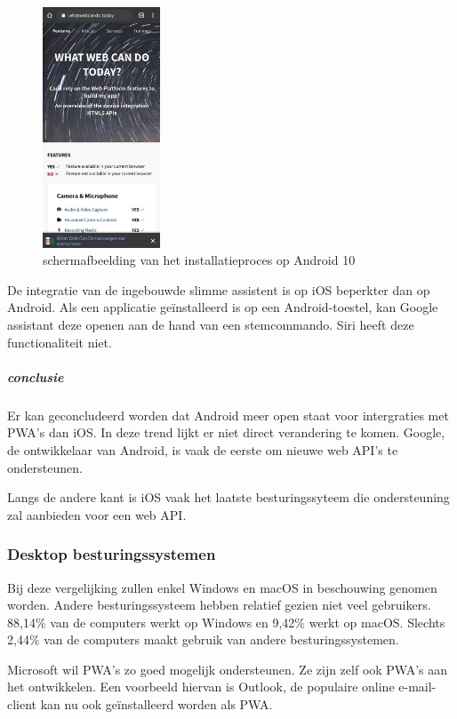 		\begin{figure}[H]
			\centering
			\includegraphics[width=35mm]{./img/installation_android.png}
			\caption{schermafbeelding van het installatieproces op Android 10}
			\label{A2HSExperienceIOS}
		\end{figure}
	
	
		De integratie van de ingebouwde slimme assistent is op iOS beperkter dan op Android. Als een applicatie geïnstalleerd is op een Android-toestel, kan Google assistant deze openen aan de hand van een stemcommando. Siri heeft deze functionaliteit niet.
		\autocite{Lathiya2020}
		
		\newpage
		\subparagraph{conclusie}
		
			Er kan geconcludeerd worden dat Android meer open staat voor intergraties met PWA's dan iOS. In deze trend lijkt er niet direct verandering te komen. Google, de ontwikkelaar van Android, is vaak de eerste om nieuwe web API's te ondersteunen.
			
			Langs de andere kant is iOS vaak het laatste besturingssyteem die ondersteuning zal aanbieden voor een web API.
	
	
	\subsubsection{Desktop besturingssystemen}
		Bij deze vergelijking zullen enkel Windows en macOS in beschouwing genomen worden. Andere besturingssysteem hebben relatief gezien niet veel gebruikers. 88,14\% van de computers werkt op Windows en 9,42\% werkt op macOS. Slechts 2,44\% van de computers maakt gebruik van andere besturingssystemen.
		\autocite{netMarketShare2020}
		
		Microsoft wil PWA's zo goed mogelijk ondersteunen. Ze zijn zelf ook PWA's aan het ontwikkelen. Een voorbeeld hiervan is Outlook, de populaire online e-mail-client kan nu ook geïnstalleerd worden als PWA.
		\autocite{Microsoft2020a}
		
